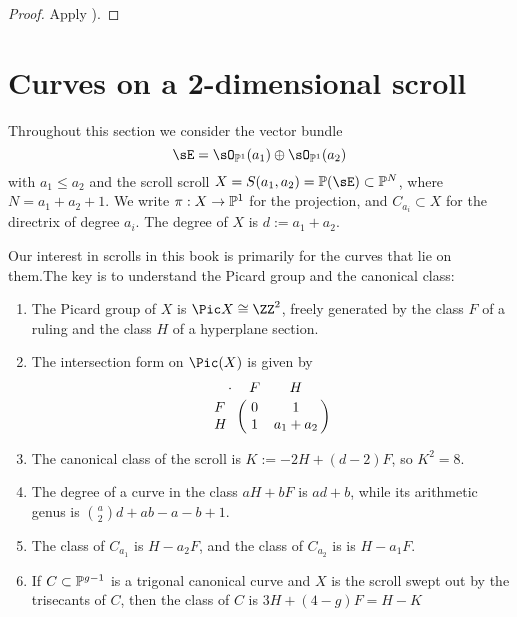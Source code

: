 \begin{proof}
Apply \cite[II.7.12]{Hartshorne1977}).
\end{proof}

\section{Curves on a 2-dimensional scroll} 
 Throughout this section we consider the vector bundle 
$$
\sE = \sO_{\PP^1}(a_1) \oplus\sO_{\PP^1}(a_2)
$$
with $a_1\leq a_2$ and the scroll
scroll $X = S(a_{1}, a_{2}) = \PP(\sE) \subset \PP^N$, where $N = a_1+a_2+1$. We write $\pi:X \to \PP^1$ for the projection, and
$C_{a_i}\subset X$ for the directrix of degree $a_i$. The degree of $X$ is $d := a_1+a_2$.

Our interest in scrolls in this book is primarily for the curves that lie on them.The key is to understand the Picard group and the canonical class:

\begin{theorem}\label{pic of scroll}
\begin{enumerate}
\item The Picard group of $X$ is $\Pic X \cong \ZZ^2$, freely generated by  the class $F$ of a ruling and the class $H$ of a  hyperplane section. 
\item The
intersection form on $\Pic(X)$ is given by
$$
\bordermatrix{\kern 10pt\cdot&F&H\cr
F&0&1\cr
H&1&a_{1}+a_{2}
}
$$

\item The canonical class of the scroll is $K := -2H +(d-2)F$, so $K^2 = 8$.

\item The degree of a curve in the class $aH+bF$ is $ad+b$, while its arithmetic genus is
${a\choose 2}d+ab-a-b+1$.

\item The class of $C_{a_1}$
is $H-a_2F$, and the class of $C_{a_2}$ is 
is $H-a_1F$. 
\item If $C \subset \PP^{g-1}$ is a trigonal canonical curve and $X$ is the scroll swept out by the trisecants of $C$, then the class of $C$ is $3H+(4-g)F = H-K$
\end{enumerate}
\end{theorem}


